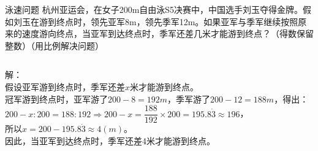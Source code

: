 \documentclass[aspectratio=169]{ctexbeamer} %
\date{\today}
\begin{document}
\begin{frame}[t]{泳速问题}
杭州亚运会，在女子200m自由泳S5决赛中，中国选手刘玉夺得金牌。假如刘玉在游到终点时，领先亚军8m，领先季军12m。如果亚军与季军继续按照原来的速度游向终点，当亚军到达终点时，季军还差几米才能游到终点？（得数保留整数）（用比例解决问题）\\
\pause
\begin{columns}
解：\\
假设亚军游到终点时，季军还差$x$米才能游到终点。\\
冠军游到终点时，亚军游了$200 - 8 = 192m$，季军游了$200 - 12 = 188m$，得出：
$200 - x : 200  = 188 : 192 \Rightarrow 200 - x = \dfrac{188}{192} \times 200 = 195.8 \dot 3 \approx 196$，\\
所以$x = 200 - 195.8 \dot 3 \approx  4(m)$。\\
因此，当亚军到达终点时，季军还差\alert{4}米才能游到终点。

\end{columns}
\end{frame}
\end{document}
